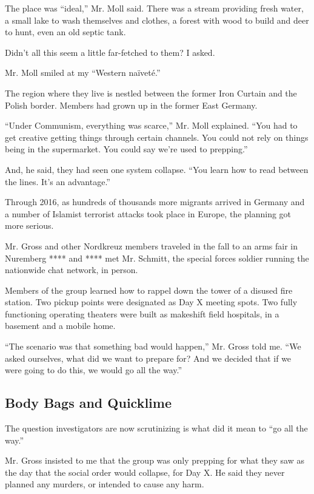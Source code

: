 The place was ``ideal,'' Mr. Moll said. There was a stream providing
fresh water, a small lake to wash themselves and clothes, a forest with
wood to build and deer to hunt, even an old septic tank.

Didn't all this seem a little far-fetched to them? I asked.

Mr. Moll smiled at my ``Western naïveté.''

The region where they live is nestled between the former Iron Curtain
and the Polish border. Members had grown up in the former East Germany.

``Under Communism, everything was scarce,'' Mr. Moll explained. ``You
had to get creative getting things through certain channels. You could
not rely on things being in the supermarket. You could say we're used to
prepping.''

And, he said, they had seen one system collapse. ``You learn how to read
between the lines. It's an advantage.''

Through 2016, as hundreds of thousands more migrants arrived in Germany
and a number of Islamist terrorist attacks took place in Europe, the
planning got more serious.

Mr. Gross and other Nordkreuz members traveled in the fall to an arms
fair in Nuremberg **** and **** met Mr. Schmitt, the special forces
soldier running the nationwide chat network, in person.

Members of the group learned how to rappel down the tower of a disused
fire station. Two pickup points were designated as Day X meeting spots.
Two fully functioning operating theaters were built as makeshift field
hospitals, in a basement and a mobile home.

``The scenario was that something bad would happen,'' Mr. Gross told me.
``We asked ourselves, what did we want to prepare for? And we decided
that if we were going to do this, we would go all the way.''

\hypertarget{body-bags-and-quicklime}{%
\subsection{Body Bags and Quicklime}\label{body-bags-and-quicklime}}

The question investigators are now scrutinizing is what did it mean to
``go all the way.''

Mr. Gross insisted to me that the group was only prepping for what they
saw as the day that the social order would collapse, for Day X. He said
they never planned any murders, or intended to cause any harm.

